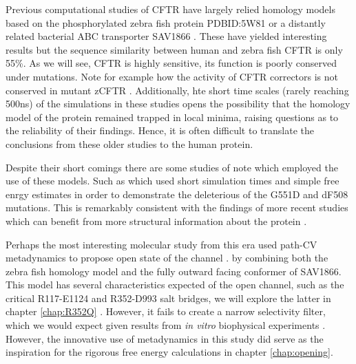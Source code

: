 \begin{enumerate}
\end{enumerate}



Previous computational studies of CFTR have largely relied homology models based on the phosphorylated zebra fish protein PDBID:5W81 \cite{zhang2017a} or a distantly related bacterial ABC transporter SAV1866 \cite{dawson2006, Hoffmann2018}. These have yielded interesting results but the sequence similarity between human and zebra fish CFTR is only 55\%. As we will see, CFTR is highly sensitive, its function is poorly conserved under mutations. Note for example how the activity of CFTR correctors is not conserved in mutant zCFTR \cite{laselva2019}. Additionally, hte short time scales (rarely reaching 500ns) of the simulations in these studies opens the possibility that the homology model of the protein remained trapped in local minima, raising questions as to the reliability of their findings.  Hence, it is often difficult to translate the conclusions from these older studies to the human protein. 

Despite their short comings there are some studies of note which employed the use of these models. Such as \cite{belmonte2015} which used short simulation times and simple free enrgy estimates in order to demonstrate the deleterious of the G551D and dF508 mutations. This is remarkably consistent with the findings of more recent studies which can benefit from more structural information about the protein \cite{}. 

Perhaps the most interesting molecular study from this era used path-CV metadynamics to propose open state of the channel \cite{Hoffmann2018}. by combining both the zebra fish homology model and the fully outward facing conformer of SAV1866. This model has several characteristics expected of the open channel, such as the critical R117-E1124 and R352-D993 salt bridges, we will explore the latter in chapter \ref{chap:R352Q} \cite{simon2021, cui2013a}. However, it fails to create a narrow selectivity filter, which we would expect given results from \textit{in vitro} biophysical experiments \cite{linsdell2016, linsdell2017, linsdell2021, li2018b, linsdell2020, negoda2019}. However, the innovative use of metadynamics in this study did serve as the inspiration for the rigorous free energy calculations in chapter \ref{chap:opening}. 

